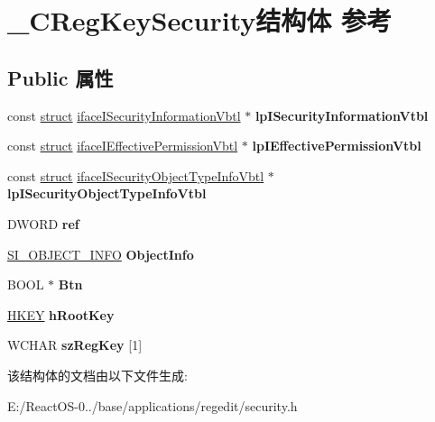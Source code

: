 \hypertarget{struct___c_reg_key_security}{}\section{\+\_\+\+C\+Reg\+Key\+Security结构体 参考}
\label{struct___c_reg_key_security}
\subsection*{Public 属性}
\begin{DoxyCompactItemize}
\item 
\mbox{\label{struct___c_reg_key_security_ac49b58e1c2b1d0d8ab1d87a3082d76b0}} 
const \hyperlink{interfacestruct}{struct} \hyperlink{structiface_i_security_information_vbtl}{iface\+I\+Security\+Information\+Vbtl} $\ast$ {\bfseries lp\+I\+Security\+Information\+Vtbl}
\item 
\mbox{\label{struct___c_reg_key_security_aa5593676af0cd245ae2347c5df6e447a}} 
const \hyperlink{interfacestruct}{struct} \hyperlink{structiface_i_effective_permission_vbtl}{iface\+I\+Effective\+Permission\+Vbtl} $\ast$ {\bfseries lp\+I\+Effective\+Permission\+Vtbl}
\item 
\mbox{\label{struct___c_reg_key_security_ae9e7f031dd64388716e84af99ee4a31b}} 
const \hyperlink{interfacestruct}{struct} \hyperlink{structiface_i_security_object_type_info_vbtl}{iface\+I\+Security\+Object\+Type\+Info\+Vbtl} $\ast$ {\bfseries lp\+I\+Security\+Object\+Type\+Info\+Vtbl}
\item 
\mbox{\label{struct___c_reg_key_security_ad6e2616f5ecf1ecc6d5061f1e0b27002}} 
D\+W\+O\+RD {\bfseries ref}
\item 
\mbox{\label{struct___c_reg_key_security_a7e69ad61bb5532d5bc8ead5017955329}} 
\hyperlink{struct___s_i___o_b_j_e_c_t___i_n_f_o}{S\+I\+\_\+\+O\+B\+J\+E\+C\+T\+\_\+\+I\+N\+FO} {\bfseries Object\+Info}
\item 
\mbox{\label{struct___c_reg_key_security_ae1f317197929935e3ebf840d47acd7d4}} 
B\+O\+OL $\ast$ {\bfseries Btn}
\item 
\mbox{\label{struct___c_reg_key_security_a0d6649030ca729076ff89dcc5b6977cf}} 
\hyperlink{interfacevoid}{H\+K\+EY} {\bfseries h\+Root\+Key}
\item 
\mbox{\label{struct___c_reg_key_security_acda49d2909c43bdc39b21be704faa169}} 
W\+C\+H\+AR {\bfseries sz\+Reg\+Key} \mbox{[}1\mbox{]}
\end{DoxyCompactItemize}


该结构体的文档由以下文件生成\+:\begin{DoxyCompactItemize}
\item 
E\+:/\+React\+O\+S-\/0../base/applications/regedit/security.\+h\end{DoxyCompactItemize}
